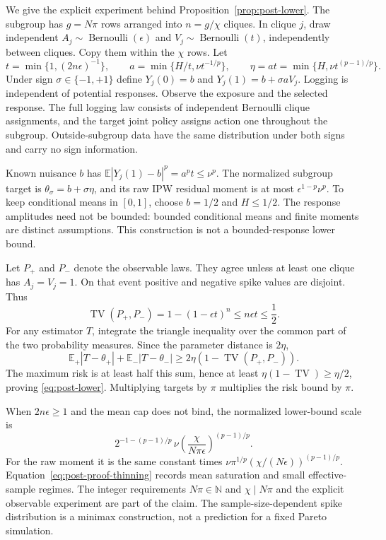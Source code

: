 We give the explicit experiment behind Proposition~\ref{prop:post-lower}.
The subgroup has $g=N\pi$ rows arranged into $n=g/\chi$ cliques. In clique $j$,
draw independent $A_j\sim\operatorname{Bernoulli}(\epsilon)$ and
$V_j\sim\operatorname{Bernoulli}(t)$, independently between cliques. Copy them
within the $\chi$ rows. Let
\begin{equation}
 t=\min\{1,(2n\epsilon)^{-1}\},\qquad
 a=\min\{H/t,\nu t^{-1/p}\},\qquad
 \eta=at=\min\{H,\nu t^{(p-1)/p}\}.
 \label{eq:post-proof-thinning}
\end{equation}
Under sign $\sigma\in\{-1,+1\}$ define
$Y_j(0)=b$ and $Y_j(1)=b+\sigma aV_j$. Logging is independent of potential
responses. Observe the exposure and the selected response. The full logging
law consists of independent Bernoulli clique assignments, and the target joint
policy assigns action one throughout the subgroup. Outside-subgroup data have
the same distribution under both signs and carry no sign information.

Known nuisance $b$ has
$\mathbb E|Y_j(1)-b|^p=a^pt\leq\nu^p$. The normalized subgroup target is
$\theta_\sigma=b+\sigma\eta$, and its raw IPW residual moment is at most
$\epsilon^{1-p}\nu^p$. To keep conditional means in $[0,1]$, choose $b=1/2$
and $H\leq 1/2$. The response amplitudes need not be bounded: bounded conditional
means and finite moments are distinct assumptions. This construction is not a
bounded-response lower bound.

Let $P_+$ and $P_-$ denote the observable laws. They agree unless at least one
clique has $A_j=V_j=1$. On that event positive and negative spike values are
disjoint. Thus
\begin{equation}
 \operatorname{TV}(P_+,P_-)
   =1-(1-\epsilon t)^n
   \leq n\epsilon t\leq\frac 12.
 \label{eq:post-proof-tv}
\end{equation}
For any estimator $T$, integrate the triangle inequality over the common
part of the two probability measures. Since the parameter distance is
$2\eta$,
\begin{equation}
 \mathbb E_+|T-\theta_+|+\mathbb E_-|T-\theta_-|
 \geq 2\eta(1-\operatorname{TV}(P_+,P_-)).
\end{equation}
The maximum risk is at least half this sum, hence at least
$\eta(1-\operatorname{TV})\geq\eta/2$, proving
\eqref{eq:post-lower}. Multiplying targets by $\pi$ multiplies the risk bound
by $\pi$.

When $2n\epsilon\geq 1$ and the mean cap does not bind, the normalized
lower-bound scale is
\[
2^{-1-(p-1)/p}\,\nu\left(\frac{\chi}{N\pi\epsilon}\right)^{(p-1)/p}.
\]
For the raw
moment it is the same constant times
$\nu\pi^{1/p}(\chi/(N\epsilon))^{(p-1)/p}$.
Equation~\eqref{eq:post-proof-thinning} records mean saturation and small
effective-sample regimes. The integer requirements $N\pi\in\mathbb N$ and
$\chi\mid N\pi$ and the explicit observable experiment are part of the claim.
The sample-size-dependent spike distribution is a minimax construction, not a
prediction for a fixed Pareto simulation.

